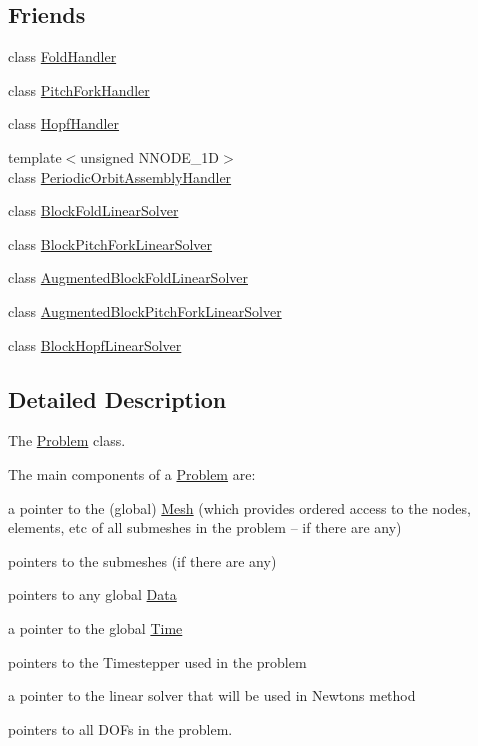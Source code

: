 \subsection*{Friends}
\begin{DoxyCompactItemize}
\item 
class \hyperlink{classoomph_1_1Problem_a1d79584bd556f960d5b92474681e0159}{Fold\+Handler}
\item 
class \hyperlink{classoomph_1_1Problem_a58bcd2e5d47842c64018e2c842bff302}{Pitch\+Fork\+Handler}
\item 
class \hyperlink{classoomph_1_1Problem_a5653c9ce9d673e348e945594469ce0d3}{Hopf\+Handler}
\item 
{\footnotesize template$<$unsigned N\+N\+O\+D\+E\+\_\+1D$>$ }\\class \hyperlink{classoomph_1_1Problem_a2cbe986bcd27c28d5de7ada068d3d94c}{Periodic\+Orbit\+Assembly\+Handler}
\item 
class \hyperlink{classoomph_1_1Problem_a32e190795c94d11d2e206e62eb63994b}{Block\+Fold\+Linear\+Solver}
\item 
class \hyperlink{classoomph_1_1Problem_aba62ac8cc057be07657972adc4a78b45}{Block\+Pitch\+Fork\+Linear\+Solver}
\item 
class \hyperlink{classoomph_1_1Problem_a29d9c39e6a14d2a4cc4e0d7c716579fe}{Augmented\+Block\+Fold\+Linear\+Solver}
\item 
class \hyperlink{classoomph_1_1Problem_a223dd55e02e905ce0ce98e98f50b7e57}{Augmented\+Block\+Pitch\+Fork\+Linear\+Solver}
\item 
class \hyperlink{classoomph_1_1Problem_a199677d64d3b2f908690d10a2398b737}{Block\+Hopf\+Linear\+Solver}
\end{DoxyCompactItemize}


\subsection{Detailed Description}
The \hyperlink{classoomph_1_1Problem}{Problem} class. 

The main components of a \hyperlink{classoomph_1_1Problem}{Problem} are\+:
\begin{DoxyItemize}
\item a pointer to the (global) \hyperlink{classoomph_1_1Mesh}{Mesh} (which provides ordered access to the nodes, elements, etc of all submeshes in the problem -- if there are any)
\item pointers to the submeshes (if there are any)
\item pointers to any global \hyperlink{classoomph_1_1Data}{Data}
\item a pointer to the global \hyperlink{classoomph_1_1Time}{Time}
\item pointers to the Timestepper used in the problem
\item a pointer to the linear solver that will be used in Newton\textquotesingle{}s method
\item pointers to all D\+O\+Fs in the problem.
\end{DoxyItemize}

